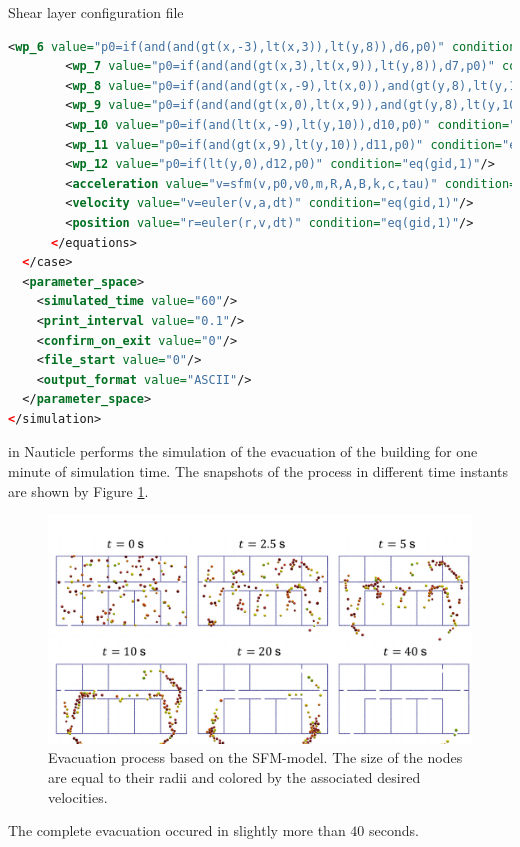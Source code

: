 \documentclass[a4paper,12pt,openany]{book}
\theoremstyle{break}
\begin{document}
\begin{samepage}
\begin{example}{Shear layer configuration file}{}
\begin{lstlisting}[language=XML]
        <wp_6 value="p0=if(and(and(gt(x,-3),lt(x,3)),lt(y,8)),d6,p0)" condition="eq(gid,1)"/>
        <wp_7 value="p0=if(and(and(gt(x,3),lt(x,9)),lt(y,8)),d7,p0)" condition="eq(gid,1)"/>
        <wp_8 value="p0=if(and(and(gt(x,-9),lt(x,0)),and(gt(y,8),lt(y,10))),d8,p0)" condition="eq(gid,1)"/>
        <wp_9 value="p0=if(and(and(gt(x,0),lt(x,9)),and(gt(y,8),lt(y,10))),d9,p0)" condition="eq(gid,1)"/>
        <wp_10 value="p0=if(and(lt(x,-9),lt(y,10)),d10,p0)" condition="eq(gid,1)"/>
        <wp_11 value="p0=if(and(gt(x,9),lt(y,10)),d11,p0)" condition="eq(gid,1)"/>
        <wp_12 value="p0=if(lt(y,0),d12,p0)" condition="eq(gid,1)"/>
        <acceleration value="v=sfm(v,p0,v0,m,R,A,B,k,c,tau)" condition="eq(gid,1)"/>
        <velocity value="v=euler(v,a,dt)" condition="eq(gid,1)"/>
        <position value="r=euler(r,v,dt)" condition="eq(gid,1)"/>
      </equations>
  </case>
  <parameter_space>
    <simulated_time value="60"/>
    <print_interval value="0.1"/>
    <confirm_on_exit value="0"/>
    <file_start value="0"/>
    <output_format value="ASCII"/>
  </parameter_space>
</simulation>
\end{lstlisting}
\end{example}
\end{samepage}
in Nauticle performs the simulation of the evacuation of the building for one minute of simulation time. The snapshots of the process in different time instants are shown by Figure \ref{fig:SMF_result}.
\begin{figure}[H]
  \includegraphics[scale=0.6]{evacuation_result.pdf}
  \centering
  \caption{Evacuation process based on the SFM-model. The size of the nodes are equal to their radii and colored by the associated desired velocities.}
  \label{fig:SMF_result}
\end{figure}\vspace*{3pt}
The complete evacuation occured in slightly more than $40$ seconds.
\end{document}

